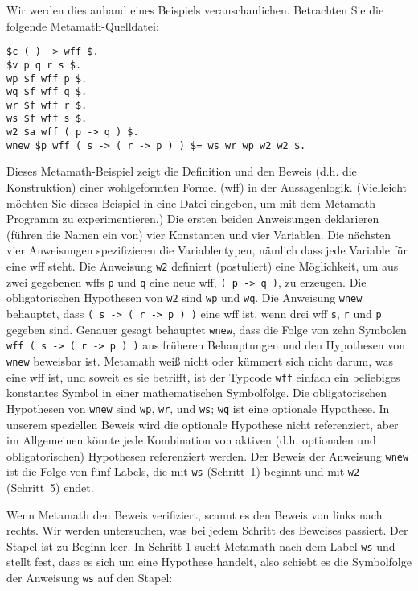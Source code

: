 Wir werden dies anhand eines Beispiels veranschaulichen. Betrachten Sie die folgende Metamath-Quelldatei:
\begin{verbatim}
$c ( ) -> wff $.
$v p q r s $.
wp $f wff p $.
wq $f wff q $.
wr $f wff r $.
ws $f wff s $.
w2 $a wff ( p -> q ) $.
wnew $p wff ( s -> ( r -> p ) ) $= ws wr wp w2 w2 $.
\end{verbatim}
Dieses Metamath-Beispiel zeigt die Definition und den Beweis (d.h. die Konstruktion) einer wohlgeformten Formel (wff) in der Aussagenlogik.  (Vielleicht möchten Sie dieses Beispiel in eine Datei eingeben, um mit dem Metamath-Programm zu experimentieren.)  Die ersten beiden Anweisungen deklarieren (führen die Namen ein von) vier Konstanten und vier Variablen.  Die nächsten vier Anweisungen spezifizieren die Variablentypen, nämlich dass jede Variable für eine wff steht.  Die Anweisung \texttt{w2} definiert (postuliert) eine Möglichkeit, um aus zwei gegebenen wffs \texttt{p} und \texttt{q} eine neue wff, \texttt{( p -> q )}, zu erzeugen. Die obligatorischen Hypothesen von \texttt{w2} sind \texttt{wp} und \texttt{wq}. Die Anweisung \texttt{wnew} behauptet, dass \texttt{( s -> ( r -> p ) )} eine wff ist, wenn drei wff \texttt{s}, \texttt{r} und \texttt{p} gegeben sind.  Genauer gesagt behauptet \texttt{wnew}, dass die Folge von zehn Symbolen \texttt{wff ( s -> ( r -> p ) )} aus früheren Behauptungen und den Hypothesen von \texttt{wnew} beweisbar ist.  Metamath weiß nicht oder kümmert sich nicht darum, was eine wff ist, und soweit es sie betrifft, ist der Typcode \texttt{wff} einfach ein beliebiges konstantes Symbol in einer mathematischen Symbolfolge.  Die obligatorischen Hypothesen von \texttt{wnew} sind \texttt{wp}, \texttt{wr}, und \texttt{ws}; \texttt{wq} ist eine optionale Hypothese.  In unserem speziellen Beweis wird die optionale Hypothese nicht referenziert, aber im Allgemeinen könnte jede Kombination von aktiven (d.h. optionalen und obligatorischen) Hypothesen referenziert werden.  Der Beweis der Anweisung \texttt{wnew} ist die Folge von fünf Labels, die mit \texttt{ws} (Schritt~1) beginnt und mit \texttt{w2} (Schritt~5) endet.

Wenn Metamath den Beweis verifiziert, scannt es den Beweis von links nach rechts.  Wir werden untersuchen, was bei jedem Schritt des Beweises passiert.  Der Stapel ist zu Beginn leer.  In Schritt 1 sucht Metamath nach dem Label \texttt{ws} und stellt fest, dass es sich um eine Hypothese handelt, also schiebt es die Symbolfolge der Anweisung \texttt{ws} auf den Stapel:

